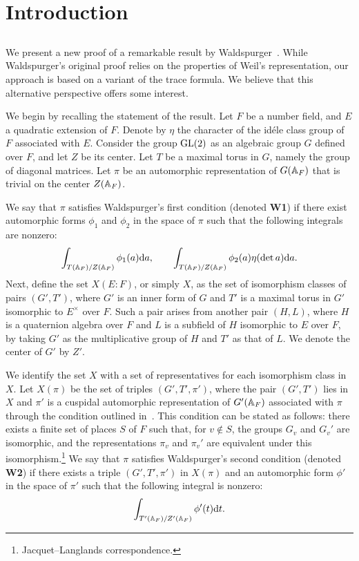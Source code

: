 

\section{Introduction}
\subsection{}

We present a new proof of a remarkable result by Waldspurger~\cite[Theorem 2]{waldspurger1985valeurs}.
While Waldspurger's original proof relies on the properties of Weil's representation, our approach is based on a variant of the trace formula.
We believe that this alternative perspective offers some interest.

We begin by recalling the statement of the result.
Let $F$ be a number field, and $E$ a quadratic extension of $F$.
Denote by $\eta$ the character of the id\'ele class group of $F$ associated with $E$.
Consider the group $\mathrm{GL}(2)$ as an algebraic group $G$ defined over $F$, and let $Z$ be its center.
Let $T$ be a maximal torus in $G$, namely the group of diagonal matrices.
Let $\pi$ be an automorphic representation of $G(\mathbb{A}_F)$ that is trivial on the center $Z(\mathbb{A}_F)$.

We say that $\pi$ satisfies Waldspurger's first condition (denoted \textbf{W1}) if there exist automorphic forms $\phi_1$ and $\phi_2$ in the space of $\pi$ such that the following integrals are nonzero:
\begin{equation}
    \int_{T(\mathbb{A}_F) / Z(\mathbb{A}_F)} \phi_1(a) \mathrm{d} a, \qquad \int_{T(\mathbb{A}_F) / Z(\mathbb{A}_F)} \phi_2(a) \eta(\det a) \mathrm{d} a.
\end{equation}
Next, define the set $X(E:F)$, or simply $X$, as the set of isomorphism classes of pairs $(G', T')$, where $G'$ is an inner form of $G$ and $T'$ is a maximal torus in $G'$ isomorphic to $E^\times$ over $F$.
Such a pair arises from another pair $(H, L)$, where $H$ is a quaternion algebra over $F$ and $L$ is a subfield of $H$ isomorphic to $E$ over $F$, by taking $G'$ as the multiplicative group of $H$ and $T'$ as that of $L$.
We denote the center of $G'$ by $Z'$.

We identify the set $X$ with a set of representatives for each isomorphism class in $X$.
Let $X(\pi)$ be the set of triples $(G', T', \pi')$, where the pair $(G', T')$ lies in $X$ and $\pi'$ is a cuspidal automorphic representation of $G'(\mathbb{A}_F)$ associated with $\pi$ through the condition outlined in~\cite{jacquet2006automorphic}.
This condition can be stated as follows: there exists a finite set of places $S$ of $F$ such that, for $v \notin S$, the groups $G_v$ and $G_v'$ are isomorphic, and the representations $\pi_v$ and $\pi_v'$ are equivalent under this isomorphism.\footnote{Jacquet--Langlands correspondence.}
We say that $\pi$ satisfies Waldspurger's second condition (denoted \textbf{W2}) if there exists a triple $(G', T', \pi')$ in $X(\pi)$ and an automorphic form $\phi'$ in the space of $\pi'$ such that the following integral is nonzero:
\begin{equation}
    \int_{T'(\mathbb{A}_F) / Z'(\mathbb{A}_F)} \phi'(t) \mathrm{d} t.
\end{equation}

